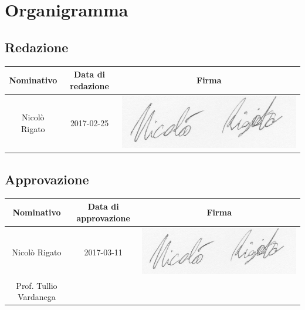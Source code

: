 \clearpage

\appendix
\section{Organigramma}
\subsection{Redazione}

\begin{center}
  \centering
  \begin{tabular}{|c|c|c|}
    \hline
    \textbf{Nominativo} & \textbf{Data di redazione} & \textbf{Firma} \\
    \hline
    Nicolò Rigato & 2017-02-25 & 
    \begin{minipage}{.3\textwidth}
      \includegraphics[width=\linewidth]{../../../file_comuni/firme/nr.jpg}
    \end{minipage}
 \\\hline
  \end{tabular}

\end{center}

\subsection{Approvazione}

\begin{center}
	\centering
	\begin{tabular}{|c|c|c|}
		\hline
		\textbf{Nominativo} & \textbf{Data di approvazione} & \textbf{Firma} \\
		\hline Nicolò Rigato & 2017-03-11 & 
    \begin{minipage}{.3\textwidth}
      \includegraphics[width=\linewidth]{../../../file_comuni/firme/nr.jpg}
    \end{minipage}
 \\
		\hline Prof. Tullio Vardanega &  &  \\[40pt]\hline
	\end{tabular}
	
\end{center}

